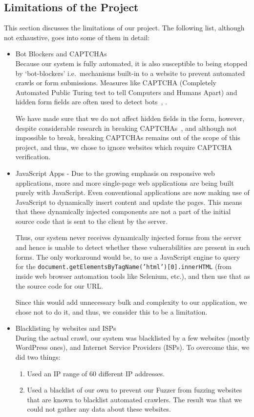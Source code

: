 \subsection[Limitations]{Limitations of the Project}
\label{limitations}
	This section discusses the limitations of our project. The following list, although not exhaustive, goes into some of them in detail: 
	\begin{itemize}
		\item Bot Blockers and CAPTCHAs\\
		Because our system is fully automated, it is also susceptible to being stopped by `bot-blockers' i.e.\ mechanisms built-in to a website to prevent automated crawls or form submissions. Measures like CAPTCHA (Completely Automated Public Turing test to tell Computers and Humans Apart) and hidden form fields are often used to detect bots~\cite{captchas3}, \cite{captchas2}.
		
		We have made sure that we do not affect hidden fields in the form, however, despite considerable research in breaking CAPTCHAs~\cite{captchas2}, \cite{captchas} and although not impossible to break, breaking CAPTCHAs remains out of the scope of this project, and thus, we chose to ignore websites which require CAPTCHA verification.
		
		\item JavaScript Apps - Due to the growing emphasis on responsive web applications, more and more single-page web applications are being built purely with JavaScript. Even conventional applications are now making use of JavaScript to dynamically insert content and update the pages. This means that these dynamically injected components are not a part of the initial source code that is sent to the client by the server.
		
		Thus, our system never receives dynamically injected forms from the server and hence is unable to detect whether these vulnerabilities are present in such forms. The only workaround would be, to use a JavaScript engine to query for the \texttt{document.getElementsByTagName('html')[0].innerHTML} (from inside web browser automation tools like Selenium, etc.), and then use that as the source code for our URL.
		
		Since this would add unnecessary bulk and complexity to our application, we chose not to do it, and thus, we consider this to be a limitation.
		
		\item Blacklisting by websites and ISPs\\
		During the actual crawl, our system was blacklisted by a few websites (mostly WordPress ones), and Internet Service Providers (ISPs).
		To overcome this, we did two things:
		\begin{enumerate}
			\item Used an IP range of 60 different IP addresses. 
			\item Used a blacklist of our own to prevent our Fuzzer from fuzzing websites that are known to blacklist automated crawlers.  The result was that we could not gather any data about these websites.
		\end{enumerate}
		

\end{itemize}

